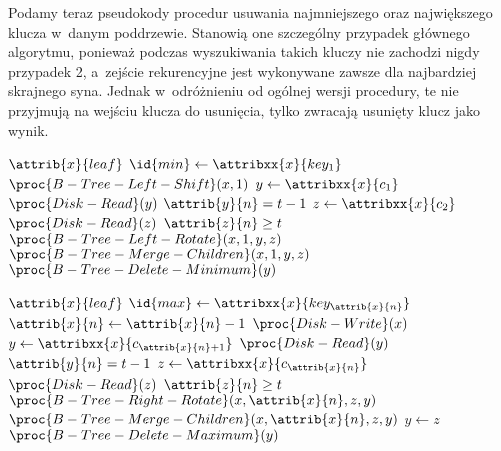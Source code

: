 Podamy teraz pseudokody procedur usuwania najmniejszego oraz największego klucza w~danym poddrzewie.
Stanowią one szczególny przypadek głównego algorytmu, ponieważ podczas wyszukiwania takich kluczy nie zachodzi nigdy przypadek 2, a~zejście rekurencyjne jest wykonywane zawsze dla najbardziej skrajnego syna.
Jednak w~odróżnieniu od ogólnej wersji procedury, te nie przyjmują na wejściu klucza do usunięcia, tylko zwracają usunięty klucz jako wynik.
\begin{codebox}
    \li \If $\attrib{x}{leaf}$
    \li     \Then $\id{min}\gets\attribxx{x}{key_1}$
    \li         $\proc{B-Tree-Left-Shift}(x,1)$
    \li         \Return {}
            \End
    \li $y\gets\attribxx{x}{c_1}$
    \li $\proc{Disk-Read}(y)$
    \li \If $\attrib{y}{n}=t-1$
    \li     \Then $z\gets\attribxx{x}{c_2}$
    \li         $\proc{Disk-Read}(z)$
    \li         \If $\attrib{z}{n}\ge t$
    \li             \Then $\proc{B-Tree-Left-Rotate}(x,1,y,z)$
    \li             \Else $\proc{B-Tree-Merge-Children}(x,1,y,z)$
                    \End
            \End
    \li \Return $\proc{B-Tree-Delete-Minimum}(y)$
\end{codebox}
\begin{codebox}
    \li \If $\attrib{x}{leaf}$
    \li     \Then $\id{max}\gets\attribxx{x}{key_{\attrib{x}{n}}}$
    \li         $\attrib{x}{n}\gets\attrib{x}{n}-1$
    \li         $\proc{Disk-Write}(x)$
    \li         \Return {}
            \End
    \li $y\gets\attribxx{x}{c_{\attrib{x}{n}+1}}$
    \li $\proc{Disk-Read}(y)$
    \li \If $\attrib{y}{n}=t-1$
    \li     \Then $z\gets\attribxx{x}{c_{\attrib{x}{n}}}$
    \li         $\proc{Disk-Read}(z)$
    \li         \If $\attrib{z}{n}\ge t$
    \li             \Then $\proc{B-Tree-Right-Rotate}(x,\attrib{x}{n},z,y)$
    \li             \Else $\proc{B-Tree-Merge-Children}(x,\attrib{x}{n},z,y)$
    \li                 $y\gets z$
                    \End
            \End
    \li \Return $\proc{B-Tree-Delete-Maximum}(y)$
\end{codebox}

